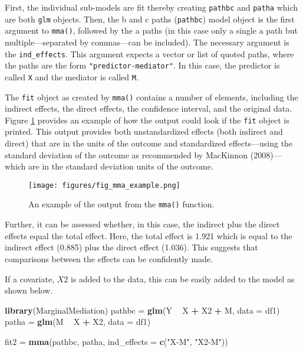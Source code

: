 \documentclass[]{DissertateUSU}
\newenvironment{Shaded}{\begin{snugshade}}{\end{snugshade}}
\newcommand{\KeywordTok}[1]{\textcolor[rgb]{0.13,0.29,0.53}{\textbf{#1}}}
\newcommand{\DataTypeTok}[1]{\textcolor[rgb]{0.13,0.29,0.53}{#1}}
\newcommand{\StringTok}[1]{\textcolor[rgb]{0.31,0.60,0.02}{#1}}
\newcommand{\OperatorTok}[1]{\textcolor[rgb]{0.81,0.36,0.00}{\textbf{#1}}}
\newcommand{\NormalTok}[1]{#1}
\begin{document}
\doublespacing

First, the individual sub-models are fit thereby creating
\texttt{pathbc} and \texttt{patha} which are both \texttt{glm} objects.
Then, the b and c paths (\texttt{pathbc}) model object is the first
argument to \texttt{mma()}, followed by the a paths (in this case only a
single a path but multiple---separated by commas---can be included). The
necessary argument is the \texttt{ind\_effects}. This argument expects a
vector or list of quoted paths, where the paths are the form
\texttt{"predictor-mediator"}. In this case, the predictor is called
\texttt{X} and the mediator is called \texttt{M}.

The \texttt{fit} object as created by \texttt{mma()} contains a number
of elements, including the indirect effects, the direct effects, the
confidence interval, and the original data. Figure \ref{fig_mmaexample}
provides an example of how the output could look if the \texttt{fit}
object is printed. This output provides both unstandardized effects
(both indirect and direct) that are in the units of the outcome and
standardized effects---using the standard deviation of the outcome as
recommended by MacKinnon (2008)---which are in the standard deviation
units of the outcome.

\begin{figure}[tb]
\centering
\texttt{[image: figures/fig\_mma\_example.png]}
\caption{An example of the output from the \texttt{mma()} function.}
\label{fig_mmaexample}
\end{figure}

Further, it can be assessed whether, in this case, the indirect plus the
direct effects equal the total effect. Here, the total effect is 1.921
which is equal to the indirect effect (0.885) plus the direct effect
(1.036). This suggests that comparisons between the effects can be
confidently made.

If a covariate, \(X2\) is added to the data, this can be easily added to
the model as shown below.

\singlespacing

\begin{Shaded}
\begin{Highlighting}[]
\KeywordTok{library}\NormalTok{(MarginalMediation)}
\NormalTok{pathbc =}\StringTok{ }\KeywordTok{glm}\NormalTok{(Y }\OperatorTok{~}\StringTok{ }\NormalTok{X }\OperatorTok{+}\StringTok{ }\NormalTok{X2 }\OperatorTok{+}\StringTok{ }\NormalTok{M, }\DataTypeTok{data =}\NormalTok{ df1)}
\NormalTok{patha  =}\StringTok{ }\KeywordTok{glm}\NormalTok{(M }\OperatorTok{~}\StringTok{ }\NormalTok{X }\OperatorTok{+}\StringTok{ }\NormalTok{X2, }\DataTypeTok{data =}\NormalTok{ df1)}

\NormalTok{fit2 =}\StringTok{ }\KeywordTok{mma}\NormalTok{(pathbc,}
\NormalTok{           patha,}
           \DataTypeTok{ind_effects =} \KeywordTok{c}\NormalTok{(}\StringTok{"X-M"}\NormalTok{,}
                           \StringTok{"X2-M"}\NormalTok{))}
\end{Highlighting}
\end{Shaded}
\end{document}
